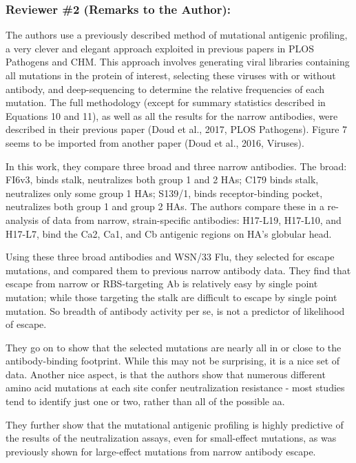 \documentclass[11pt, oneside]{article}   	%
\begin{document}
\subsubsection*{Reviewer \#2 (Remarks to the Author):}

The authors use a previously described method of mutational antigenic profiling, a very clever and elegant approach exploited in previous papers in PLOS Pathogens and CHM. This approach involves generating viral libraries containing all mutations in the protein of interest, selecting these viruses with or without antibody, and deep-sequencing to determine the relative frequencies of each mutation. The full methodology (except for summary statistics described in Equations 10 and 11), as well as all the results for the narrow antibodies, were described in their previous paper (Doud et al., 2017, PLOS Pathogens). Figure 7 seems to be imported from another paper (Doud et al., 2016, Viruses).

In this work, they compare three broad and three narrow antibodies. The broad: FI6v3, binds stalk, neutralizes both group 1 and 2 HAs; C179 binds stalk, neutralizes only some group 1 HAs; S139/1, binds receptor-binding pocket, neutralizes both group 1 and group 2 HAs. The authors compare these in a re-analysis of data from narrow, strain-specific antibodies: H17-L19, H17-L10, and H17-L7, bind the Ca2, Ca1, and Cb antigenic regions on HA's globular head.

Using these three broad antibodies and WSN/33 Flu, they selected for escape mutations, and compared them to previous narrow antibody data. They find that escape from narrow or RBS-targeting Ab is relatively easy by single point mutation; while those targeting the stalk are difficult to escape by single point mutation. So breadth of antibody activity per se, is not a predictor of likelihood of escape.

They go on to show that the selected mutations are nearly all in or close to the antibody-binding footprint. While this may not be surprising, it is a nice set of data. Another nice aspect, is that the authors show that numerous different amino acid mutations at each site confer neutralization resistance - most studies tend to identify just one or two, rather than all of the possible aa.

They further show that the mutational antigenic profiling is highly predictive of the
results of the neutralization assays, even for small-effect mutations, as was previously shown for large-effect mutations from narrow antibody escape.
\end{document}
